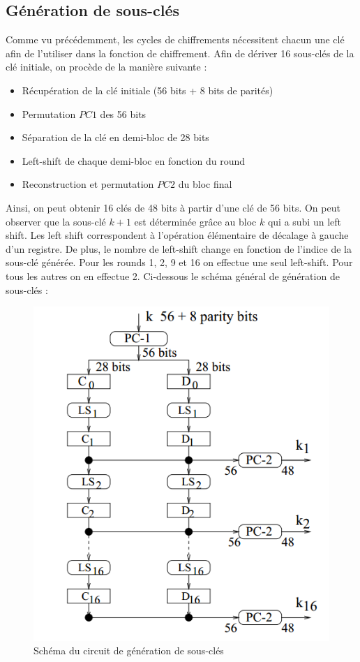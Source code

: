 \documentclass[a4paper]{article}
\begin{document}
\subsection{Génération de sous-clés}
Comme vu précédemment, les cycles de chiffrements nécessitent chacun une clé afin de l'utiliser dans la fonction de chiffrement. Afin de dériver 16 sous-clés de la clé initiale, on procède de la manière suivante :
\begin{itemize}
\item Récupération de la clé initiale (56 bits + 8 bits de parités)
\item Permutation $PC1$ des 56 bits
\item Séparation de la clé en demi-bloc de 28 bits
\item Left-shift de chaque demi-bloc en fonction du round
\item Reconstruction et permutation $PC2$ du bloc final
\end{itemize}

Ainsi, on peut obtenir 16 clés de 48 bits à partir d'une clé de 56 bits. On peut observer que la sous-clé $k+1$ est déterminée grâce au bloc $k$ qui a subi un left shift. Les left shift correspondent à l'opération élémentaire de décalage à gauche d'un registre. De plus, le nombre de left-shift change en fonction de l'indice de la sous-clé générée. Pour les rounds 1, 2, 9 et 16 on effectue une seul left-shift. Pour tous les autres on en effectue 2.
\smallbreak
Ci-dessous le schéma général de génération de sous-clés :
\begin{figure}[h]
\begin{center}
\includegraphics[scale=0.5]{images/key.png} 
\caption{Schéma du circuit de génération de sous-clés}
\end{center}
\end{figure}
\end{document}

